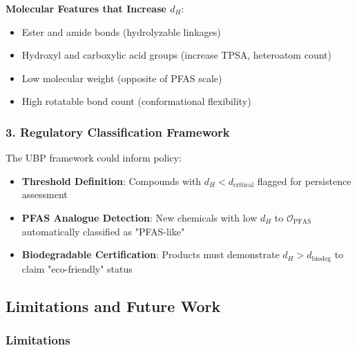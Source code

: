 \documentclass[11pt,letterpaper]{article}
\begin{document}
\textbf{Molecular Features that Increase $d_H$}:
\begin{itemize}
    \item Ester and amide bonds (hydrolyzable linkages)
    \item Hydroxyl and carboxylic acid groups (increase TPSA, heteroatom count)
    \item Low molecular weight (opposite of PFAS scale)
    \item High rotatable bond count (conformational flexibility)
\end{itemize}

\subsubsection{3. Regulatory Classification Framework}

The UBP framework could inform policy:
\begin{itemize}
    \item \textbf{Threshold Definition}: Compounds with $d_H < d_{\text{critical}}$ flagged for persistence assessment
    \item \textbf{PFAS Analogue Detection}: New chemicals with low $d_H$ to $\mathcal{O}_{\text{PFAS}}$ automatically classified as "PFAS-like"
    \item \textbf{Biodegradable Certification}: Products must demonstrate $d_H > d_{\text{biodeg}}$ to claim "eco-friendly" status
\end{itemize}

\subsection{Limitations and Future Work}

\subsubsection{Limitations}
\end{document}
